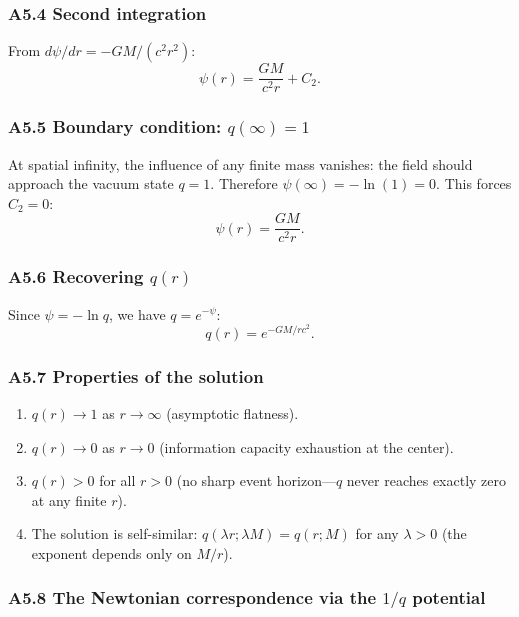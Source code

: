 \documentclass[reprint]{revtex4-2}
\begin{document}
\subsubsection{A5.4 Second integration}

From $d\psi/dr = -GM/(c^2 r^2)$:
\begin{equation}
\psi(r) = \frac{GM}{c^2 r} + C_2.
\end{equation}

\subsubsection{A5.5 Boundary condition: $q(\infty)=1$}

At spatial infinity, the influence of any finite mass vanishes: the field should approach the vacuum state $q=1$. Therefore $\psi(\infty) = -\ln(1) = 0$. This forces $C_2 = 0$:
\begin{equation}
\psi(r) = \frac{GM}{c^2 r}.
\end{equation}

\subsubsection{A5.6 Recovering $q(r)$}

Since $\psi = -\ln q$, we have $q = e^{-\psi}$:
\begin{equation}
\boxed{q(r) = e^{-GM/rc^2}}.
\label{eq:q_spherical}
\end{equation}

\subsubsection{A5.7 Properties of the solution}

\begin{enumerate}[label=(\roman*)]
\item $q(r) \to 1$ as $r\to\infty$ (asymptotic flatness).
\item $q(r) \to 0$ as $r\to 0$ (information capacity exhaustion at the center).
\item $q(r) > 0$ for all $r > 0$ (no sharp event horizon---$q$ never reaches exactly zero at any finite $r$).
\item The solution is self-similar: $q(\lambda r; \lambda M) = q(r; M)$ for any $\lambda > 0$ (the exponent depends only on $M/r$).
\end{enumerate}

\subsubsection{A5.8 The Newtonian correspondence via the $1/q$ potential}
\end{document}

